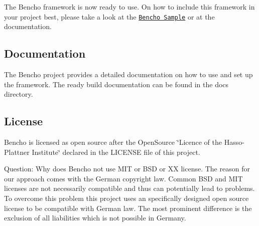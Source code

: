 The Bencho framework is now ready to use. On how to include this framework in your project best, please take a look at the \href{https://github.com/schwald/benchosample}{\tt Bencho Sample} or at the documentation.

\subsection*{Documentation}

The Bencho project provides a detailed documentation on how to use and set up the framework. The ready build documentation can be found in the docs directory.

\subsection*{License}

Bencho is licensed as open source after the Open\-Source \char`\"{}\-Licence of the Hasso-\/\-Plattner Institute\char`\"{} declared in the L\-I\-C\-E\-N\-S\-E file of this project.

Question\-: Why does Bencho not use M\-I\-T or B\-S\-D or X\-X license. The reason for our approach comes with the German copyright law. Common B\-S\-D and M\-I\-T licenses are not necessarily compatible and thus can potentially lead to problems. To overcome this problem this project uses an specifically designed open source license to be compatible with German law. The most prominent difference is the exclusion of all liabilities which is not possible in Germany. 
